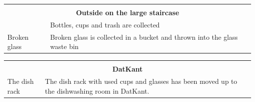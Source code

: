 \documentclass[a4paper,10pt,oneside,article]{memoir}
\begin{document}
\vspace{0.5cm}
\noindent
\begin{tabular}{|l|l|}
    \hline
    \multicolumn{2}{|c|}{} \\
    \multicolumn{2}{|c|}{\Large \textbf{Outside on the large staircase}} \\
    \hline
    \begin{minipage}[t]{0.15\textwidth}
        
    \end{minipage} & 
    \begin{minipage}[t]{0.80\textwidth}
        Bottles, cups and trash are collected
    \end{minipage} \\
    \hline
    \begin{minipage}[t]{0.15\textwidth}
        Broken glass
    \end{minipage} & 
    \begin{minipage}[t]{0.80\textwidth}
        Broken glass is collected in a bucket and thrown into the glass waste bin
    \end{minipage} \\
    \hline
\end{tabular}

\vspace{0.5cm}
\noindent
\begin{tabular}{|l|l|}
    \hline
    \multicolumn{2}{|c|}{} \\
    \multicolumn{2}{|c|}{\Large \textbf{DatKant}} \\
    \hline
    \begin{minipage}[t]{0.15\textwidth}
        The dish rack
    \end{minipage} & 
    \begin{minipage}[t]{0.80\textwidth}
        The dish rack with used cups and glasses has been moved up to the
        dishwashing room in DatKant.
    \end{minipage} \\
    \hline
\end{tabular}
\end{document}
